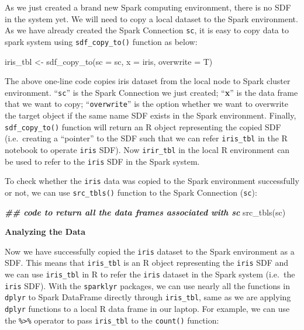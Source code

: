 \documentclass[
  12pt,
]{krantz}
\makeatletter
\newenvironment{Shaded}{\begin{snugshade}}{\end{snugshade}}
\newcommand{\AttributeTok}[1]{\textcolor[rgb]{0.61,0.61,0.61}{#1}}
\newcommand{\DocumentationTok}[1]{\textcolor[rgb]{0.37,0.37,0.37}{\textbf{\textit{#1}}}}
\newcommand{\FunctionTok}[1]{\textcolor[rgb]{0,0,0}{#1}}
\newcommand{\NormalTok}[1]{#1}
\newcommand{\OtherTok}[1]{\textcolor[rgb]{0.37,0.37,0.37}{#1}}
\newenvironment{kframe}{%
\medskip{}
\setlength{\fboxsep}{.8em}
 \def\at@end@of@kframe{}%
 \ifinner\ifhmode%
  \def\at@end@of@kframe{\end{minipage}}%
  \begin{minipage}{\columnwidth}%
 \fi\fi%
 \def\FrameCommand##1{\hskip\@totalleftmargin \hskip-\fboxsep
 \colorbox{shadecolor}{##1}\hskip-\fboxsep
     \hskip-\linewidth \hskip-\@totalleftmargin \hskip\columnwidth}%
 \MakeFramed {\advance\hsize-\width
   \@totalleftmargin\z@ \linewidth\hsize
   \@setminipage}}%
 {\par\unskip\endMakeFramed%
 \at@end@of@kframe}
\renewenvironment{Shaded}{\begin{kframe}}{\end{kframe}}
\makeatother
\begin{document}
As we just created a brand new Spark computing environment, there is no SDF in the system yet. We will need to copy a local dataset to the Spark environment. As we have already created the Spark Connection \texttt{sc}, it is easy to copy data to spark system using \texttt{sdf\_copy\_to()} function as below:

\begin{Shaded}
\begin{Highlighting}[]
\NormalTok{iris\_tbl }\OtherTok{\textless{}{-}} \FunctionTok{sdf\_copy\_to}\NormalTok{(}\AttributeTok{sc =}\NormalTok{ sc, }\AttributeTok{x =}\NormalTok{ iris, }\AttributeTok{overwrite =}\NormalTok{ T)}
\end{Highlighting}
\end{Shaded}

The above one-line code copies iris dataset from the local node to Spark cluster environment. ``\texttt{sc}'' is the Spark Connection we just created; ``\textbf{x}'' is the data frame that we want to copy; ``\texttt{overwrite}'' is the option whether we want to overwrite the target object if the same name SDF exists in the Spark environment. Finally, \texttt{sdf\_copy\_to()} function will return an R object representing the copied SDF (i.e.~creating a ``pointer'' to the SDF such that we can refer \texttt{iris\_tbl} in the R notebook to operate \texttt{iris} SDF). Now \texttt{irir\_tbl} in the local R environment can be used to refer to the \texttt{iris} SDF in the Spark system.

To check whether the \texttt{iris} data was copied to the Spark environment successfully or not, we can use \texttt{src\_tbls()} function to the Spark Connection (\texttt{sc}):

\begin{Shaded}
\begin{Highlighting}[]
\DocumentationTok{\#\# code to return all the data frames associated with sc}
\FunctionTok{src\_tbls}\NormalTok{(sc) }
\end{Highlighting}
\end{Shaded}

\textbf{Analyzing the Data}

Now we have successfully copied the \texttt{iris} dataset to the Spark environment as a SDF. This means that \texttt{iris\_tbl} is an R object representing the \texttt{iris} SDF and we can use \texttt{iris\_tbl} in R to refer the \texttt{iris} dataset in the Spark system (i.e.~the \texttt{iris} SDF). With the \texttt{sparklyr} packages, we can use nearly all the functions in \texttt{dplyr} to Spark DataFrame directly through \texttt{iris\_tbl}, same as we are applying \texttt{dplyr} functions to a local R data frame in our laptop. For example, we can use the \texttt{\%\textgreater{}\%} operator to pass \texttt{iris\_tbl} to the \texttt{count()} function:
\end{document}
